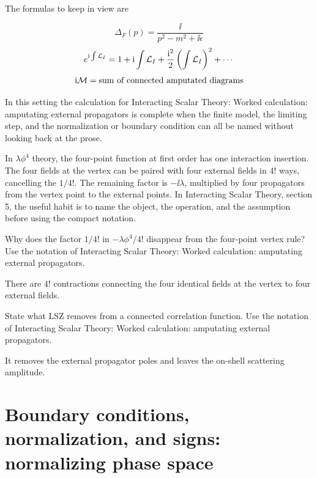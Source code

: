 The formulas to keep in view are

\[
  \Delta_F(p)=\frac{\ii}{p^2-m^2+\ii\epsilon}
\]
\[
  e^{\mathrm i\int\mathcal L_I}=1+\mathrm i\int\mathcal L_I+\frac{\mathrm i^2}{2}\left(\int\mathcal L_I\right)^2+\cdots
\]
\[
  \mathrm i\mathcal M=\hbox{sum of connected amputated diagrams}
\]

In this setting the calculation for Interacting Scalar Theory: Worked calculation: amputating external propagators is complete when the finite model, the limiting step, and the normalization or boundary condition can all be named without looking back at the prose.




\begin{example}
In \(\lambda\phi^4\) theory, the four-point function at first order has one interaction insertion.  The four fields at the vertex can be paired with four external fields in \(4!\) ways, cancelling the \(1/4!\).  The remaining factor is \(-\ii\lambda\), multiplied by four propagators from the vertex point to the external points.  In Interacting Scalar Theory, section 5, the useful habit is to name the object, the operation, and the assumption before using the compact notation.
\end{example}



\begin{exercise}
Why does the factor \(1/4!\) in \(-\lambda\phi^4/4!\) disappear from the four-point vertex rule?  Use the notation of Interacting Scalar Theory: Worked calculation: amputating external propagators.
\begin{answer}
There are \(4!\) contractions connecting the four identical fields at the vertex to four external fields.
\end{answer}
\end{exercise}

\begin{exercise}
State what LSZ removes from a connected correlation function.  Use the notation of Interacting Scalar Theory: Worked calculation: amputating external propagators.
\begin{answer}
It removes the external propagator poles and leaves the on-shell scattering amplitude.
\end{answer}
\end{exercise}



\section{Boundary conditions, normalization, and signs: normalizing phase space}


